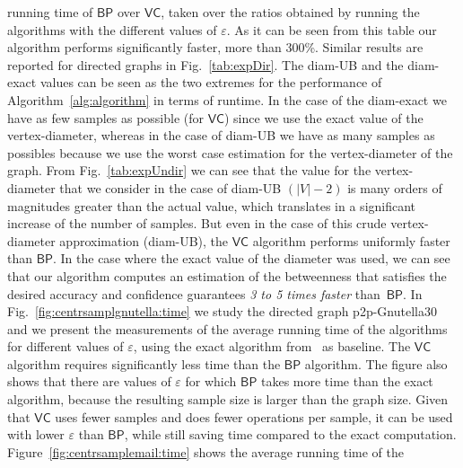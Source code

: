running time of $\mathsf{BP}$ over $\mathsf{VC}$, taken over the ratios obtained
by running the algorithms with the different values of $\varepsilon$. As it can
be seen from this table our algorithm performs significantly faster, more than
300\%. Similar results are reported for directed graphs in Fig.~\ref{tab:expDir}.
The diam-UB
and the diam-exact values can be seen as the two extremes for the performance of 
Algorithm~\ref{alg:algorithm} in terms of runtime. In the case of the diam-exact
we have as few samples as possible (for $\mathsf{VC}$) since we use the exact
value of the vertex-diameter, whereas in the case of diam-UB we have as many
samples as possibles because we use the worst case estimation for the
vertex-diameter of the graph.  %
From Fig.~\ref{tab:expUndir} we can see that the value for the
vertex-diameter that we consider in the case of diam-UB $(|V|-2)$ is many orders of
magnitudes greater than the actual value, which translates in a significant
increase of the number of samples. But even in the case of this crude
vertex-diameter approximation (diam-UB), the $\mathsf{VC}$ algorithm performs uniformly faster than
$\mathsf{BP}$. In the case where the exact value of the diameter was used, we
can see that our algorithm computes an estimation of the betweenness that
satisfies the desired accuracy and confidence guarantees \emph{3 to 5 times
faster} than~$\mathsf{BP}$. 
 In Fig.~\ref{fig:centrsamplgnutella:time} we study
the directed graph p2p-Gnutella30 and we present the measurements of
the average running time of the algorithms for different values of
$\varepsilon$, using the exact algorithm from~\citep{Brandes01} as baseline. The
$\mathsf{VC}$ algorithm requires significantly less time than the $\mathsf{BP}$
algorithm. The figure also shows that there are values of $\varepsilon$ for
which $\mathsf{BP}$ takes more time than the exact algorithm, because the
resulting sample size is larger than the graph size. Given that $\mathsf{VC}$
uses fewer samples and does fewer operations per sample, it can be used with
lower $\varepsilon$ than $\mathsf{BP}$, while still saving time compared to the
exact computation. Figure~\ref{fig:centrsamplemail:time} shows the average running time of the
